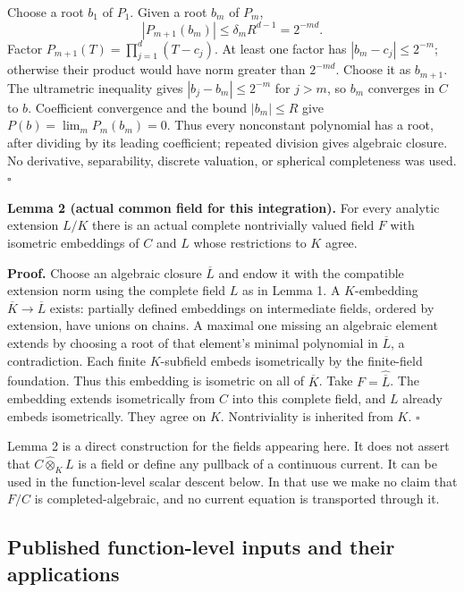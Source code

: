\documentclass[
  11pt,
]{article}
\begin{document}
Choose a root \(b_1\) of \(P_1\). Given a root \(b_m\) of \(P_m\), \[
 |P_{m+1}(b_m)|\leq\delta_m R^{d-1}=2^{-md}.
\] Factor \(P_{m+1}(T)=\prod_{j=1}^d(T-c_j)\). At least one factor has
\(|b_m-c_j|\leq2^{-m}\); otherwise their product would have norm greater
than \(2^{-md}\). Choose it as \(b_{m+1}\). The ultrametric inequality
gives \(|b_j-b_m|\leq2^{-m}\) for \(j>m\), so \(b_m\) converges in \(C\)
to \(b\). Coefficient convergence and the bound \(|b_m|\leq R\) give
\(P(b)=\lim_m P_m(b_m)=0\). Thus every nonconstant polynomial has a
root, after dividing by its leading coefficient; repeated division gives
algebraic closure. No derivative, separability, discrete valuation, or
spherical completeness was used. \(\square\)

\textbf{Lemma 2 (actual common field for this integration).} For every
analytic extension \(L/K\) there is an actual complete nontrivially
valued field \(F\) with isometric embeddings of \(C\) and \(L\) whose
restrictions to \(K\) agree.

\textbf{Proof.} Choose an algebraic closure \(\overline L\) and endow it
with the compatible extension norm using the complete field \(L\) as in
Lemma 1. A \(K\)-embedding \(\overline K\to\overline L\) exists:
partially defined embeddings on intermediate fields, ordered by
extension, have unions on chains. A maximal one missing an algebraic
element extends by choosing a root of that element's minimal polynomial
in \(\overline L\), a contradiction. Each finite \(K\)-subfield embeds
isometrically by the finite-field foundation. Thus this embedding is
isometric on all of \(\overline K\). Take \(F=\widehat{\overline L}\).
The embedding extends isometrically from \(C\) into this complete field,
and \(L\) already embeds isometrically. They agree on \(K\).
Nontriviality is inherited from \(K\). \(\square\)

Lemma 2 is a direct construction for the fields appearing here. It does
not assert that \(C\widehat\otimes_K L\) is a field or define any
pullback of a continuous current. It can be used in the function-level
scalar descent below. In that use we make no claim that \(F/C\) is
completed-algebraic, and no current equation is transported through it.

\subsection{Published function-level inputs and their
applications}\label{published-function-level-inputs-and-their-applications}
\end{document}
